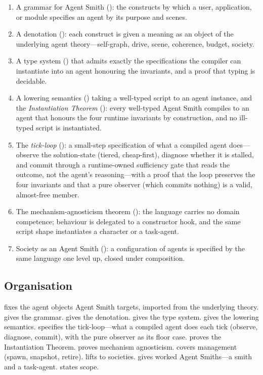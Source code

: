 \documentclass[11pt,twocolumn,a4paper]{article}
\begin{document}
\begin{enumerate}[leftmargin=*]
\item A grammar for Agent Smith (): the constructs by which
a user, application, or module specifies an agent by its purpose and scenes.
\item A denotation (): each construct is given a meaning
as an object of the underlying agent theory---self-graph, drive, scene,
coherence, budget, society.
\item A type system () that admits exactly the
specifications the compiler can instantiate into an agent honouring the
invariants, and a proof that typing is decidable.
\item A lowering semantics () taking a well-typed script to
an agent instance, and the \emph{Instantiation Theorem}
(): every well-typed Agent Smith compiles to an agent that
honours the four runtime invariants by construction, and no ill-typed script
is instantiated.
\item The \emph{tick-loop} (): a small-step specification of
what a compiled agent does---observe the solution-state (tiered, cheap-first),
diagnose whether it is stalled, and commit through a runtime-owned sufficiency
gate that reads the outcome, not the agent's reasoning---with a proof that the
loop preserves the four invariants and that a pure observer (which commits
nothing) is a valid, almost-free member.
\item The mechanism-agnosticism theorem (): the language
carries no domain competence; behaviour is delegated to a constructor hook,
and the same script shape instantiates a character or a task-agent.
\item Society as an Agent Smith (): a configuration of
agents is specified by the same language one level up, closed under
composition.
\end{enumerate}

\subsection{Organisation}

 fixes the agent objects Agent Smith targets, imported from
the underlying theory.  gives the grammar.
 gives the denotation.  gives the type
system.  gives the lowering semantics. 
specifies the tick-loop---what a compiled agent does each tick (observe,
diagnose, commit), with the pure observer as its floor case.
 proves the Instantiation Theorem. 
proves mechanism agnosticism.  covers management (spawn,
snapshot, retire).  lifts to societies.
 gives worked Agent Smiths---a smith and a task-agent.
 states scope.
\end{document}
